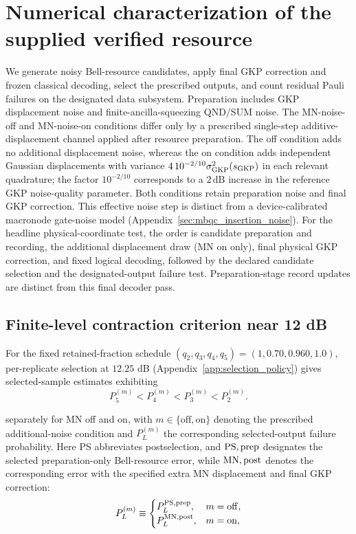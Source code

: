 \documentclass[aps,
prx,
superscriptaddress,
reprint,
longbibliography,
floatfix]{revtex4-2}
\newcounter{criterion}[section]
\newcommand{\FinalRecursiveSchedule}{(q_2,q_3,q_4,q_5)=(1,0.70,0.960,1.0)}
\begin{document}
\section{Numerical characterization of the supplied verified resource}\label{sec:threshold}
We generate noisy Bell-resource candidates, apply final GKP correction and frozen classical decoding, select the prescribed outputs, and count residual Pauli failures on the designated data subsystem. Preparation includes GKP displacement noise and finite-ancilla-squeezing QND/SUM noise. The MN-noise-off and MN-noise-on conditions differ only by a prescribed single-step additive-displacement channel applied after resource preparation. The off condition adds no additional displacement noise, whereas the on condition adds independent Gaussian displacements with variance $4\,10^{-2/10}\sigma_{\rm GKP}^{2}(s_{\rm GKP})$ in each relevant quadrature; the factor $10^{-2/10}$ corresponds to a $2\,\mathrm{dB}$ increase in the reference GKP noise-quality parameter. Both conditions retain preparation noise and final GKP correction. This effective noise step is distinct from a device-calibrated macronode gate-noise model (Appendix~\ref{sec:mbqc_insertion_noise}). For the headline physical-coordinate test, the order is candidate preparation and recording, the additional displacement draw (MN on only), final physical GKP correction, and fixed logical decoding, followed by the declared candidate selection and the designated-output failure test. Preparation-stage record updates are distinct from this final decoder pass. 

\subsection{Finite-level contraction criterion near 12 dB}
For the fixed retained-fraction schedule $\FinalRecursiveSchedule$, per-replicate selection at $12.25$ dB (Appendix~\ref{app:selection_policy}) gives selected-sample estimates exhibiting
\begin{equation}
P_{5}^{(m)}
< P_{4}^{(m)}
< P_{3}^{(m)}
< P_{2}^{(m)}.
\label{eq:recursive_l2_l5_ordering}
\end{equation}

separately for MN off and on, with $m\in\{\mathrm{off},\mathrm{on}\}$ denoting the prescribed additional-noise condition and $P_L^{(m)}$ the corresponding selected-output failure probability. Here PS abbreviates postselection, and ${\rm PS,prep}$ designates the selected preparation-only Bell-resource error, while ${\rm MN,post}$ denotes the corresponding error with the specified extra MN displacement and final GKP correction:
\begin{equation}
P_L^{(m)}\equiv
\begin{cases}
P_L^{\rm PS,prep}, & m=\mathrm{off},\\
P_L^{\rm MN,post}, & m=\mathrm{on},
\end{cases}
\label{eq:condition_specific_ordering_metric}
\end{equation}
\end{document}
